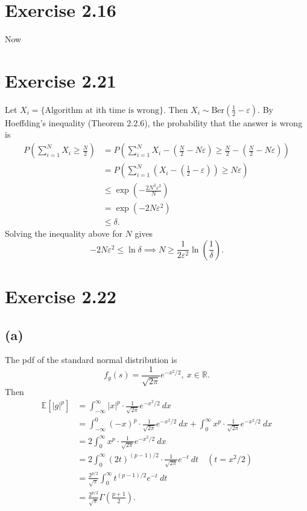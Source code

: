 \newpage
\section*{Exercise 2.16}
Now 


\newpage
\section*{Exercise 2.21}
Let $X_i = \{ \text{Algorithm at ith time is wrong} \}$. Then $X_i \sim \mathrm{Ber}(\frac{1}{2} - 
\varepsilon)$. By Hoeffding's inequality (Theorem 2.2.6), the probability that the answer is wrong is 
\begin{align*}
	P \left( \sum_{i = 1}^{N} X_i \geq \frac{N}{2} \right) 
	&= P \left( \sum_{i = 1}^{N} X_i - \left( \frac{N}{2} - N \varepsilon \right) \geq \frac{N}{2} - 
	\left( \frac{N}{2} - N \varepsilon \right) \right) \\
	&= P \left( \sum_{i = 1}^{N}\left( X_i - \left( \frac{1}{2} - \varepsilon \right) \right) \geq 
	N \varepsilon \right) \\
	&\leq \exp{\left( -\frac{2N^2 \varepsilon^2}{N} \right)} \\
	&= \exp{(-2N \varepsilon^2)} \\
	&\leq \delta.
\end{align*}
Solving the inequality above for $N$ gives 
\[ -2N \varepsilon^2 \leq \ln{\delta} \implies N \geq \frac{1}{2 \varepsilon^2}\ln{\left( \frac{1}{\delta} 
\right)}. \]


\newpage
\section*{Exercise 2.22}
\subsection*{(a)}
The pdf of the standard normal distribution is 
\[ f_g(s) = \frac{1}{\sqrt{2 \pi}} e^{-x^2 / 2}, \ x \in \mathbb{R}. \]
Then 
\begin{align*}
	\mathbb{E}\left[ |g|^p \right] 
	&= \int_{-\infty}^{\infty} |x|^p \cdot \frac{1}{\sqrt{2 \pi}} e^{-x^2 / 2} \ dx \\
	&= \int_{-\infty}^{0} (-x)^p \cdot \frac{1}{\sqrt{2 \pi}} e^{-x^2 / 2} \ dx 
	+ \int_{0}^{\infty} x^p \cdot \frac{1}{\sqrt{2 \pi}} e^{-x^2 / 2} \ dx \\
	&= 2 \int_{0}^{\infty} x^p \cdot \frac{1}{\sqrt{2 \pi}} e^{-x^2 / 2} \ dx \\
	&= 2 \int_{0}^{\infty} (2t)^{(p - 1)/2} \cdot \frac{1}{\sqrt{2 \pi}} e^{-t} \ dt \quad (t = x^2/2) \\
	&= \frac{2^{p/2}}{\sqrt{\pi}} \int_{0}^{\infty} t^{(p - 1)/2} e^{-t} \ dt \\
	&= \frac{2^{p/2}}{\sqrt{\pi}} \Gamma \left( \frac{p + 1}{2} \right).
\end{align*}

